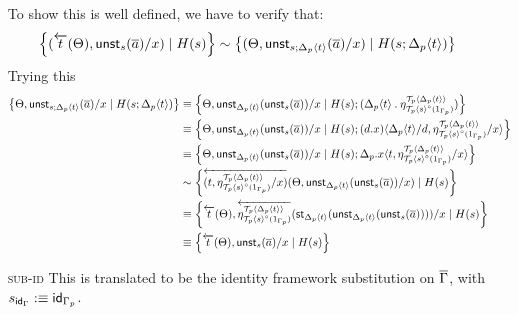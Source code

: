 \documentclass[10pt]{article}
\theoremstyle{definition}
\newcommand{\rewrite}[2]{\overleftarrow{#1}(#2)}
\newcommand\StI[2]{\ensuremath{\mathsf{st}_{#1}(#2)}}
\newcommand\UnSt[2]{\ensuremath{\mathsf{unst}_{#1}(#2)}}
\newcommand\TrCirc[2]{\ensuremath{{#1}^\circ(#2)}}
\newcommand{\id}{\mathsf{id}}
\newcommand\ApEl[2]{\mathcal{T}_{#1}\langle#2\rangle}
\newcommand\ap[2]{\ensuremath{#1 \langle #2 \rangle }}
\newcommand\bdot[0]{\mathbin{.}}
\begin{document}
\begin{enumerate}
To show this is well defined, we have to verify that:
\begin{align*}
\left\{ (\rewrite{t}{\Theta}, \UnSt{s}{\upstairs{a}}/x) \mid H(s) \right\} \sim \left\{ (\Theta, \UnSt{s;\ap{\asdep{\Delta}}{t}}{\upstairs{a}}/x) \mid H(s;\ap{\asdep{\Delta}}{t}) \right\} 
\end{align*}
Trying this
\begin{align*}
\left\{ \Theta, \UnSt{s;\ap{\asdep{\Delta}}{t}}{\upstairs{a}}/x \mid H(s;\ap{\asdep{\Delta}}{t}) \right\} 
&\equiv \left\{ \Theta, \UnSt{\ap{\asdep{\Delta}}{t}}{\UnSt{s}{\upstairs{a}}}/x \mid H(s) ; (\ap{\asdep{\Delta}}{t} \bdot \eta^{\ApEl{p}{\ap{\asdep{\Delta}}{t}}}_{\TrCirc{\ApEl{p}{s}}{1_{\asdep{\Gamma}}}})\right\} \\
&\equiv \left\{ \Theta, \UnSt{\ap{\asdep{\Delta}}{t}}{\UnSt{s}{\upstairs{a}}}/x \mid H(s) ; \ap{(d.x)}{\ap{\asdep{\Delta}}{t}/d, \eta^{\ApEl{p}{\ap{\asdep{\Delta}}{t}}}_{\TrCirc{\ApEl{p}{s}}{1_{\asdep{\Gamma}}}}/x} \right\} \\
&\equiv \left\{ \Theta, \UnSt{\ap{\asdep{\Delta}}{t}}{\UnSt{s}{\upstairs{a}}}/x \mid H(s) ; \ap{\asdep{\Delta}.x}{t,\eta^{\ApEl{p}{\ap{\asdep{\Delta}}{t}}}_{\TrCirc{\ApEl{p}{s}}{1_{\asdep{\Gamma}}}}/x} \right\} \\
&\sim \left\{ \rewrite{(t,\eta^{\ApEl{p}{\ap{\asdep{\Delta}}{t}}}_{\TrCirc{\ApEl{p}{s}}{1_{\asdep{\Gamma}}}}/x)}{\Theta, \UnSt{\ap{\asdep{\Delta}}{t}}{\UnSt{s}{\upstairs{a}}}/x} \mid H(s) \right\} \\
&\equiv \left\{ \rewrite{t}{\Theta}, \rewrite{\eta^{\ApEl{p}{\ap{\asdep{\Delta}}{t}}}_{\TrCirc{\ApEl{p}{s}}{1_{\asdep{\Gamma}}}}}{\StI{\ap{\asdep{\Delta}}{t}}{\UnSt{\ap{\asdep{\Delta}}{t}}{\UnSt{s}{\upstairs{a}}}}}/x \mid H(s) \right\} \\
&\equiv \left\{ \rewrite{t}{\Theta}, \UnSt{s}{\upstairs{a}}/x \mid  H(s) \right\}
\end{align*}

\item[\textsc{sub-id}] This is translated to be the identity framework substitution on $\overline{\Gamma}$, with $s_{\id_\Gamma} :\equiv \id_{\asdep{\Gamma}}$.


\end{enumerate}
\end{document}
